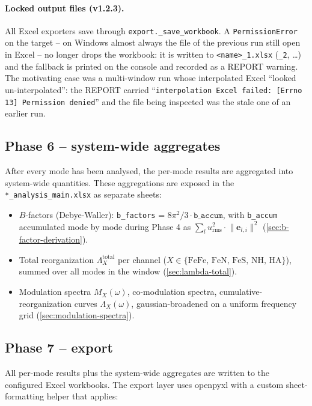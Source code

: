 \documentclass[10pt,a4paper,twoside]{article}
\newcommand{\evec}{\mathbf{e}}
\newcommand{\urms}{u_{\mathrm{rms}}}
\newcommand{\codref}[1]{%
  \quad\text{\textcolor{gray!70!black}{\footnotesize $\rightsquigarrow$~\texttt{#1}}}}
\newcommand{\fn}[1]{\texttt{#1}}
\newcommand{\file}[1]{\texttt{#1}}
\begin{document}
\paragraph{Locked output files (v1.2.3).}
All Excel exporters save through \fn{export.\_save\_workbook}. A
\texttt{PermissionError} on the target -- on Windows almost always the
file of the previous run still open in Excel -- no longer drops the
workbook: it is written to \texttt{<name>\_1.xlsx} (\texttt{\_2},
\ldots) and the fallback is printed on the console and recorded as a
REPORT warning. The motivating case was a multi-window run whose
interpolated Excel ``looked un-interpolated'': the REPORT carried
``\texttt{interpolation Excel failed: [Errno 13] Permission denied}''
and the file being inspected was the stale one of an earlier run.

\subsection{Phase 6 -- system-wide aggregates}
\label{sec:phase6-aggregate}

After every mode has been analysed, the per-mode results are
aggregated into system-wide quantities. These aggregations are
exposed in the \file{*\_analysis\_main.xlsx} as separate sheets:

\begin{itemize}
  \item $B$-factors (Debye-Waller): \fn{b\_factors} = $8\pi^2/3
        \cdot \fn{b\_accum}$, with \fn{b\_accum} accumulated mode by
        mode during Phase 4 as $\sum_l \urms^2 \cdot
        \lVert\evec_{l,i}\rVert^2$ (\cref{sec:b-factor-derivation}).
  \item Total reorganization $\Lambda_X^{\text{total}}$ per channel
        ($X \in \{\text{FeFe, FeN, FeS, NH, HA}\}$), summed over all
        modes in the window (\cref{sec:lambda-total}).
  \item Modulation spectra $M_X(\omega)$, co-modulation spectra,
        cumulative-reorganization curves $\Lambda_X(\omega)$,
        gaussian-broadened on a uniform frequency grid
        (\cref{sec:modulation-spectra}).
\end{itemize}

\subsection{Phase 7 -- export}

\codref{export.export\_all}

All per-mode results plus the system-wide aggregates are written to
the configured Excel workbooks. The export layer uses openpyxl with
a custom sheet-formatting helper that applies:
\end{document}
